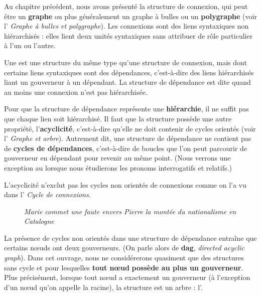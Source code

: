 Au chapitre précédent, nous avons présenté la structure de connexion, qui peut être un \textbf{graphe} ou plus généralement un graphe à bulles ou un \textbf{polygraphe} (voir l’ \textit{Graphe à bulles et polygraphe}). Les connexions sont des liens syntaxiques non hiérarchisés : elles lient deux unités syntaxiques sans attribuer de rôle particulier à l’un ou l’autre.

\begin{styleLivreImportant}
Une  est une structure du même type qu’une structure de connexion, mais dont certains liens syntaxiques sont des dépendances, c’est-à-dire des liens hiérarchisés liant un gouverneur à un dépendant. La structure de dépendance est dite  quand au moins une connexion n’est pas hiérarchisée.
\end{styleLivreImportant}

Pour que la structure de dépendance représente une \textbf{hiérarchie}, il ne suffit pas que chaque lien soit hiérarchisé. Il faut que la structure possède une autre propriété, l’\textbf{acyclicité}, c’est-à-dire qu’elle ne doit contenir de cycles orientés (voir l’ \textit{Graphe et arbre}). Autrement dit, une structure de dépendance ne contient pas de \textbf{cycles de dépendances}, c’est-à-dire de boucles que l’on peut parcourir de gouverneur en dépendant pour revenir au même point. (Nous verrons une exception au  lorsque nous étudierons les pronoms interrogatifs et relatifs.)

L’acyclicité n’exclut pas les cycles non orientés de connexions comme on l’a vu dans l’ \textit{Cycle de connexions}.

\begin{figure}\itshape
Marie commet une faute envers Pierre    la montée du nationalisme en Catalogne

\caption{\label{fig:Cycles non orientés}}

\end{figure}

La présence de cycles non orientés dans une structure de dépendance entraîne que certains nœuds ont deux gouverneurs. (On parle alors de \textbf{dag}, \textit{directed acyclic graph}). Dans cet ouvrage, nous ne considérerons quasiment que des structures sans cycle et pour lesquelles \textbf{tout nœud} \textbf{possède au plus un gouverneur}. Plus précisément, lorsque tout nœud a exactement un gouverneur (à l’exception d’un nœud qu’on appelle la racine), la structure est un arbre : l’.

